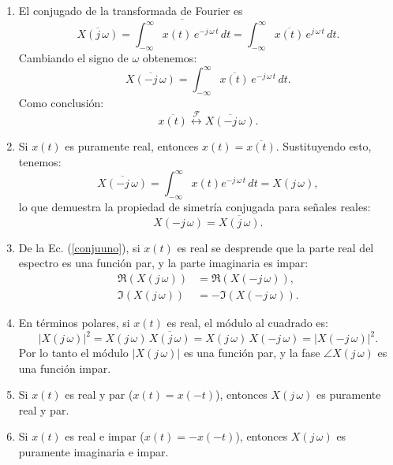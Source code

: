\begin{enumerate}
	\item El conjugado de la transformada de Fourier es 
	\begin{equation}
		\overline{X(j \, \omega)} = \overline{\int_{-\infty}^{\infty} x(t) \, e^{-j \, \omega \, t} \, dt} = \int_{-\infty}^{\infty} \overline{x(t)} \, e^{j \, \omega \, t} \, dt.
	\end{equation}
	Cambiando el signo de $\omega$ obtenemos:
	\begin{equation}
		\overline{X(-j \, \omega)} = \int_{-\infty}^{\infty} \overline{x(t)} \, e^{-j \, \omega \, t} \, dt.
	\end{equation}
	Como conclusión:
	\begin{equation}
		\overline{x(t)} \stackrel{\mathcal{F}}{\longleftrightarrow} \overline{X(-j \, \omega)} .
	\end{equation}
	
	\item Si $x(t)$ es puramente real, entonces $x(t) = \overline{x(t)}$. Sustituyendo esto, tenemos:
	\begin{equation}
		\overline{X(-j \, \omega)} = \int_{-\infty}^{\infty} x(t) e^{-j \, \omega \, t} \, dt = X(j \, \omega),
	\end{equation}
	lo que demuestra la propiedad de simetría conjugada para señales reales:
	\begin{equation}
		X(-j \, \omega) = \overline{X(j \, \omega)} . \label{conjuuno}
	\end{equation}
	
	\item De la Ec. (\ref{conjuuno}), si $x(t)$ es real se desprende que la parte real del espectro es una función par, y la parte imaginaria es impar:
	\begin{align}
		\Re(X(j \, \omega)) &= \Re(X(-j \, \omega)), \\
		\Im(X(j \, \omega)) &= -\Im(X(-j \, \omega)).
	\end{align}
	
	\item En términos polares, si $x(t)$ es real, el módulo al cuadrado es:
	\begin{equation}
		|X(j \, \omega)|^{2} = X(j \, \omega) \, \overline{X(j \, \omega)} = X(j \, \omega) \, X(-j \, \omega) = |X(-j \, \omega)|^{2}.
	\end{equation}
	Por lo tanto el módulo $|X(j \, \omega)|$ es una función par, y la fase $\angle X(j \, \omega)$ es una función impar.
	
	\item Si $x(t)$ es real y par ($x(t) = x(-t)$), entonces $X(j \, \omega)$ es puramente real y par.
	\item Si $x(t)$ es real e impar ($x(t) = -x(-t)$), entonces $X(j \, \omega)$ es puramente imaginaria e impar.
\end{enumerate}

